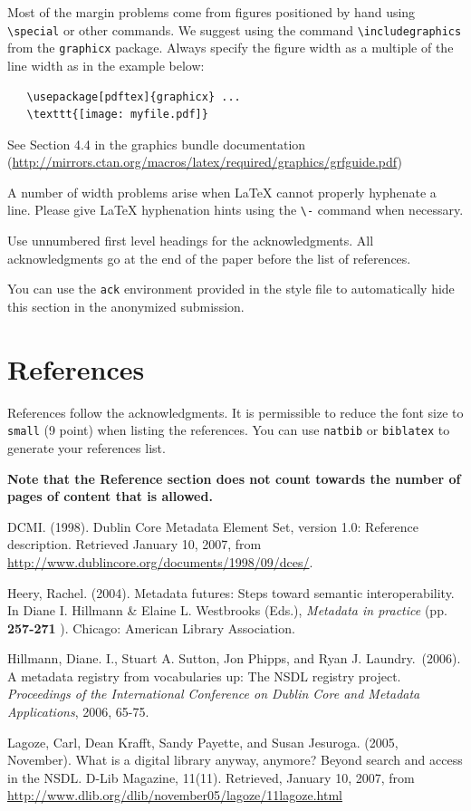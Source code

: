 \documentclass[11pt,a4paper]{article}
\begin{document}
Most of the margin problems come from figures positioned by hand using
\verb+\special+ or other commands. We suggest using the command
\verb+\includegraphics+ from the \verb+graphicx+ package. Always specify the
figure width as a multiple of the line width as in the example below:
\begin{verbatim}
   \usepackage[pdftex]{graphicx} ...
   \texttt{[image: myfile.pdf]}
\end{verbatim}
See Section 4.4 in the graphics bundle documentation
(\url{http://mirrors.ctan.org/macros/latex/required/graphics/grfguide.pdf})

A number of width problems arise when \LaTeX{} cannot properly hyphenate a
line. Please give LaTeX hyphenation hints using the \verb+\-+ command when
necessary.


\begin{ack}
Use unnumbered first level headings for the acknowledgments. All acknowledgments
go at the end of the paper before the list of references.

You can use the \texttt{ack} environment provided in the style file to automatically hide this section in the anonymized submission.
\end{ack}

\section*{References}

References follow the acknowledgments. It is permissible to reduce the font size to \verb+small+ (9 point) when listing the references. You can use \verb+natbib+ or \verb+biblatex+ to generate your references list.

{\bf Note that the Reference section does not count towards the number of pages of content that is allowed.}
\medskip

\small


\hangindent=0.7cm DCMI. (1998).  Dublin Core Metadata Element Set, version 1.0: Reference description.  Retrieved January 10, 2007, from \url{http://www.dublincore.org/documents/1998/09/dces/}. 

\hangindent=0.7cm Heery, Rachel.  (2004). Metadata futures: Steps toward semantic interoperability. In Diane I. Hillmann \& Elaine L. Westbrooks (Eds.), {\it Metadata in practice}  (pp. {\bf 257-271
}).  Chicago: American Library Association.

\hangindent=0.7cm Hillmann, Diane. I., Stuart A. Sutton, Jon Phipps, and Ryan J. Laundry.\ (2006). A metadata registry from vocabularies up: The NSDL registry project.  {\it Proceedings of the International Conference on Dublin Core and Metadata Applications}, 2006, 65-75.

\hangindent=0.7cm Lagoze, Carl, Dean Krafft, Sandy Payette, and Susan Jesuroga. (2005, November). What is a digital library anyway, anymore? Beyond search and access in the NSDL.  D-Lib Magazine, 11(11).  Retrieved, January 10, 2007, from \url{http://www.dlib.org/dlib/november05/lagoze/11lagoze.html}
\end{document}
